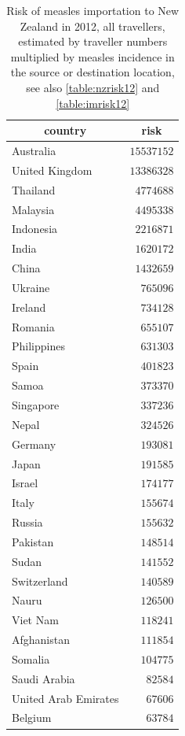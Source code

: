 \documentclass{article}
\begin{document}
\begin{table}
\caption{Risk of measles importation to New Zealand in 2012, all travellers, estimated by traveller numbers multiplied by measles incidence in the source or destination location, see also \autoref{table:nzrisk12} and \autoref{table:imrisk12}}
\begin{center}
\begin{tabular}{lr}
\hline\hline
\multicolumn{1}{c}{country}&\multicolumn{1}{c}{risk}\tabularnewline
\hline
Australia&$15537152$\tabularnewline
United Kingdom&$13386328$\tabularnewline
Thailand&$ 4774688$\tabularnewline
Malaysia&$ 4495338$\tabularnewline
Indonesia&$ 2216871$\tabularnewline
India&$ 1620172$\tabularnewline
China&$ 1432659$\tabularnewline
Ukraine&$  765096$\tabularnewline
Ireland&$  734128$\tabularnewline
Romania&$  655107$\tabularnewline
Philippines&$  631303$\tabularnewline
Spain&$  401823$\tabularnewline
Samoa&$  373370$\tabularnewline
Singapore&$  337236$\tabularnewline
Nepal&$  324526$\tabularnewline
Germany&$  193081$\tabularnewline
Japan&$  191585$\tabularnewline
Israel&$  174177$\tabularnewline
Italy&$  155674$\tabularnewline
Russia&$  155632$\tabularnewline
Pakistan&$  148514$\tabularnewline
Sudan&$  141552$\tabularnewline
Switzerland&$  140589$\tabularnewline
Nauru&$  126500$\tabularnewline
Viet Nam&$  118241$\tabularnewline
Afghanistan&$  111854$\tabularnewline
Somalia&$  104775$\tabularnewline
Saudi Arabia&$   82584$\tabularnewline
United Arab Emirates&$   67606$\tabularnewline
Belgium&$   63784$\tabularnewline
\hline
\end{tabular}\end{center}\label{table:risk12}
\end{table}
\end{document}
